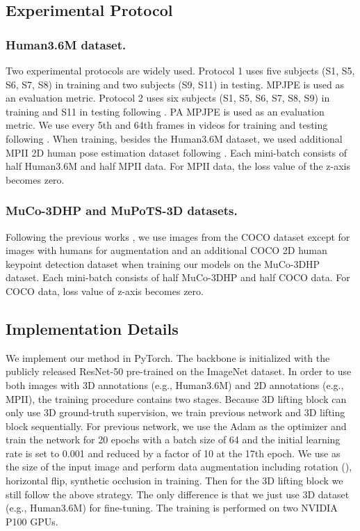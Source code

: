 \documentclass[letterpaper]{article} \usepackage{aaai21}  \usepackage{times}  \usepackage{helvet} \usepackage{courier}  \usepackage[hyphens]{url}  \usepackage{graphicx} \urlstyle{rm} \def\UrlFont{\rm}  \usepackage{natbib}  \usepackage{caption} \frenchspacing  \setlength{\pdfpagewidth}{8.5in}  \setlength{\pdfpageheight}{11in}
\begin{document}
\subsection{Experimental Protocol}

\subsubsection{Human3.6M dataset.}
Two experimental protocols are widely used. Protocol 1 uses five subjects (S1, S5, S6, S7, S8) in training and two subjects (S9, S11) in testing. MPJPE is used as an evaluation metric. Protocol 2 uses six subjects (S1, S5, S6, S7, S8, S9) in training and S11 in testing following \cite{zhou2018monocap,rogez2019lcr,moon2019camera}. PA MPJPE is used as an evaluation metric. We use every 5th and 64th frames in videos for training and testing following \cite{sun2017compositional,sun2018integral}. When training, besides the Human3.6M dataset, we used additional MPII 2D human pose estimation dataset \cite{andriluka20142d} following \cite{pavlakos2017coarse,sun2017compositional,sun2018integral,moon2019camera}. Each mini-batch consists of half Human3.6M and half MPII data. For MPII data, the loss value of the z-axis becomes zero. 

\subsubsection{MuCo-3DHP and MuPoTS-3D datasets.}
Following the previous works \cite{mehta2018single,moon2019camera}, we use images from the COCO dataset \cite{lin2014microsoft} except for images with humans for augmentation and an additional COCO 2D human keypoint detection dataset when training our models on the MuCo-3DHP dataset. Each mini-batch consists of half MuCo-3DHP and half COCO data. For COCO data, loss value of z-axis becomes zero.




\subsection{Implementation Details}

We implement our method in PyTorch. The backbone is initialized with the publicly released ResNet-50 pre-trained on the ImageNet dataset. In order to use both images with 3D annotations (e.g., Human3.6M) and 2D annotations (e.g., MPII), the training procedure contains two stages. Because 3D lifting block can only use 3D ground-truth supervision, we train previous network and 3D lifting block sequentially. For previous network, we use the Adam as the optimizer and train the network for 20 epochs with a batch size of 64 and the initial learning rate is set to 0.001 and reduced by a factor of 10 at the 17th epoch. We use  as the size of the input image and perform data augmentation including rotation (), horizontal flip, synthetic occlusion in training. Then for the 3D lifting block we still follow the above strategy. The only difference is that we just use 3D dataset (e.g., Human3.6M) for fine-tuning. The training is performed on two NVIDIA P100 GPUs.
\end{document}
